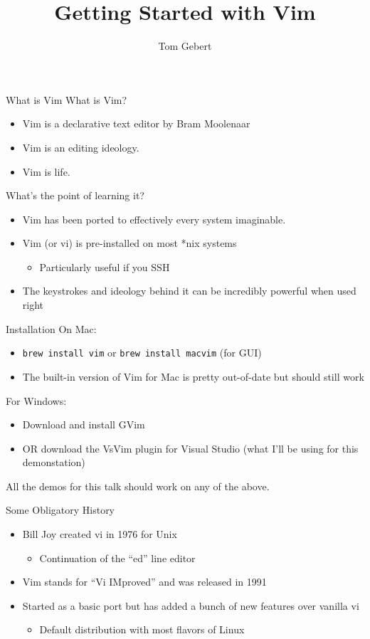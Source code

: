 \documentclass{beamer}
\title{Getting Started with Vim}
\author{Tom Gebert}
\begin{document}
  \frame{\titlepage}
\begin{frame} {What is Vim}
	What is Vim? 
	\begin{itemize}
		\item Vim is a declarative text editor by Bram Moolenaar
		\item Vim is an editing ideology. 
		\item Vim is life. 
	\end{itemize}
	What's the point of learning it? 
	\begin{itemize}
		\item Vim has been ported to effectively every system imaginable. 
		\item Vim (or vi) is pre-installed on most *nix systems \begin{itemize} 
		   \item Particularly useful if you SSH
		\end{itemize}
		\item The keystrokes and ideology behind it can be incredibly powerful when used right
	\end{itemize}

\end{frame}
\begin{frame} {Installation}
	On Mac: \begin{itemize}
		\item \texttt{brew install vim} or \texttt{brew install macvim} (for GUI)
		\item The built-in version of Vim for Mac is pretty out-of-date but should still work
                \end{itemize}
	For Windows: \begin{itemize}
		\item Download and install GVim
		\item OR download the VsVim plugin for Visual Studio (what I'll be using for this demonstation)
	\end{itemize}

	All the demos for this talk should work on any of the above.  
\end{frame}
\begin{frame}{Some Obligatory History}
  \begin{itemize}
	  \item Bill Joy created vi in 1976 for Unix \begin{itemize}
			  \item Continuation of the ``ed'' line editor
	  \end{itemize}
          \item Vim stands for ``Vi IMproved'' and was released in 1991
	  \item Started as a basic port but has added a bunch of new features over vanilla vi \begin{itemize}
			\item Default distribution with most flavors of Linux
	  \end{itemize}
		  
          
  \end{itemize}
\end{frame}
\end{document}
